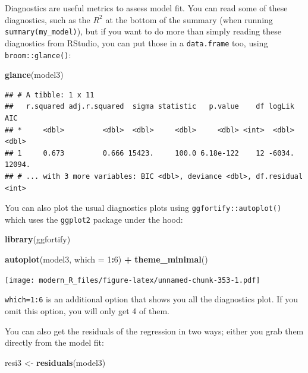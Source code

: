 \documentclass[]{gitbook}
\newenvironment{Shaded}{\begin{snugshade}}{\end{snugshade}}
\newcommand{\DataTypeTok}[1]{\textcolor[rgb]{0.13,0.29,0.53}{#1}}
\newcommand{\DecValTok}[1]{\textcolor[rgb]{0.00,0.00,0.81}{#1}}
\newcommand{\KeywordTok}[1]{\textcolor[rgb]{0.13,0.29,0.53}{\textbf{#1}}}
\newcommand{\NormalTok}[1]{#1}
\newcommand{\OperatorTok}[1]{\textcolor[rgb]{0.81,0.36,0.00}{\textbf{#1}}}
\newcommand{\StringTok}[1]{\textcolor[rgb]{0.31,0.60,0.02}{#1}}
\theoremstyle{definition}
\theoremstyle{definition}
\theoremstyle{definition}
\theoremstyle{remark}
\begin{document}
Diagnostics are useful metrics to assess model fit. You can read some of
these diagnostics, such as the \(R^2\) at the bottom of the summary
(when running \texttt{summary(my\_model)}), but if you want to do more
than simply reading these diagnostics from RStudio, you can put those in
a \texttt{data.frame} too, using \texttt{broom::glance()}:

\begin{Shaded}
\begin{Highlighting}[]
\KeywordTok{glance}\NormalTok{(model3)}
\end{Highlighting}
\end{Shaded}

\begin{verbatim}
## # A tibble: 1 x 11
##   r.squared adj.r.squared  sigma statistic   p.value    df logLik    AIC
## *     <dbl>         <dbl>  <dbl>     <dbl>     <dbl> <int>  <dbl>  <dbl>
## 1     0.673         0.666 15423.     100.0 6.18e-122    12 -6034. 12094.
## # ... with 3 more variables: BIC <dbl>, deviance <dbl>, df.residual <int>
\end{verbatim}

You can also plot the usual diagnostics plots using
\texttt{ggfortify::autoplot()} which uses the \texttt{ggplot2} package
under the hood:

\begin{Shaded}
\begin{Highlighting}[]
\KeywordTok{library}\NormalTok{(ggfortify)}

\KeywordTok{autoplot}\NormalTok{(model3, }\DataTypeTok{which =} \DecValTok{1}\OperatorTok{:}\DecValTok{6}\NormalTok{) }\OperatorTok{+}\StringTok{ }\KeywordTok{theme_minimal}\NormalTok{()}
\end{Highlighting}
\end{Shaded}

\texttt{[image: modern\_R\_files/figure-latex/unnamed-chunk-353-1.pdf]}

\texttt{which=1:6} is an additional option that shows you all the
diagnostics plot. If you omit this option, you will only get 4 of them.

You can also get the residuals of the regression in two ways; either you
grab them directly from the model fit:

\begin{Shaded}
\begin{Highlighting}[]
\NormalTok{resi3 <-}\StringTok{ }\KeywordTok{residuals}\NormalTok{(model3)}
\end{Highlighting}
\end{Shaded}
\end{document}
